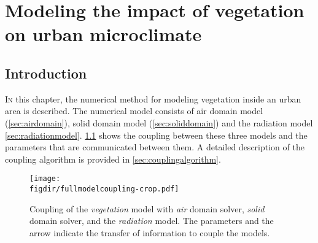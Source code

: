 \chapter{Modeling the impact of vegetation on urban microclimate}
\label{ch:numericalmethod}
\def\figdir{chapters/ch07_numericalmodel/figures}	

\section{Introduction}

\lettrine[lines=3,nindent=0em,loversize=0.1]{I}{n} this chapter, the numerical method for modeling vegetation inside an urban area is described. The numerical model consists of air domain model (\cref{sec:airdomain}), solid domain model (\cref{sec:soliddomain}) and the radiation model \cref{sec:radiationmodel}. \cref{fig:fullmodelcoupling} shows the coupling between these three models and the parameters that are communicated between them. A detailed description of the coupling algorithm is provided in \cref{sec:couplingalgorithm}. 

\begin{figure}[h]
	\centering
	\texttt{[image: \\figdir/fullmodelcoupling-crop.pdf]}
	\caption{Coupling of the \textit{vegetation} model with \textit{air} domain solver, \textit{solid} domain solver, and the \textit{radiation} model. The parameters and the arrow indicate the transfer of information to couple the models. }
	\label{fig:fullmodelcoupling}
\end{figure}

